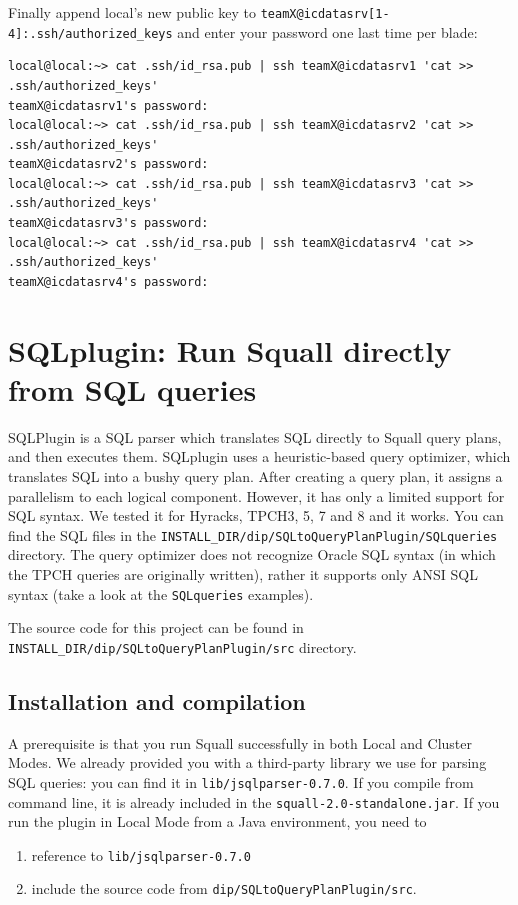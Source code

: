 \documentclass[a4paper,10pt]{article}
\begin{document}
Finally append local's new public key to \verb#teamX@icdatasrv[1-4]:.ssh/authorized_keys# and enter your password one last time per blade:
\begin{verbatim}
local@local:~> cat .ssh/id_rsa.pub | ssh teamX@icdatasrv1 'cat >> .ssh/authorized_keys'
teamX@icdatasrv1's password: 
local@local:~> cat .ssh/id_rsa.pub | ssh teamX@icdatasrv2 'cat >> .ssh/authorized_keys'
teamX@icdatasrv2's password: 
local@local:~> cat .ssh/id_rsa.pub | ssh teamX@icdatasrv3 'cat >> .ssh/authorized_keys'
teamX@icdatasrv3's password: 
local@local:~> cat .ssh/id_rsa.pub | ssh teamX@icdatasrv4 'cat >> .ssh/authorized_keys'
teamX@icdatasrv4's password: 
\end{verbatim}

\section{SQLplugin: Run Squall directly from SQL queries}
\vspace{2mm}
SQLPlugin is a SQL parser which translates SQL directly to Squall query plans, and then executes them. SQLplugin uses a heuristic-based query optimizer, which translates SQL into a bushy query plan. After creating a query plan, it assigns a parallelism to each logical component. However, it has only a limited support for SQL syntax. We tested it for Hyracks, TPCH3, 5, 7 and 8 and it works. You can find the SQL files in the \verb|INSTALL_DIR/dip/SQLtoQueryPlanPlugin/SQLqueries| directory. The query optimizer does not recognize Oracle SQL syntax (in which the TPCH queries are originally written), rather it supports only ANSI SQL syntax (take a look at the \verb|SQLqueries| examples).

The source code for this project can be found in \\ \verb|INSTALL_DIR/dip/SQLtoQueryPlanPlugin/src| directory.

\subsection{Installation and compilation}
A prerequisite is that you run Squall successfully in both Local and Cluster Modes. We already provided you with a third-party library we use for parsing SQL queries: you can find it in \verb#lib/jsqlparser-0.7.0#. If you compile from command line, it is already included in the \verb#squall-2.0-standalone.jar#. If you run the plugin in Local Mode from a Java environment, you need to
\begin{enumerate}
 \item reference to \verb#lib/jsqlparser-0.7.0#
 \item include the source code from \verb#dip/SQLtoQueryPlanPlugin/src#.
\end{enumerate}
\end{document}
